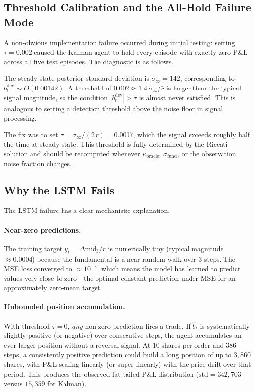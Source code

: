\documentclass[11pt]{article}
\begin{document}
\subsection{Threshold Calibration and the All-Hold Failure Mode}

A non-obvious implementation failure occurred during initial testing:
setting $\tau = 0.002$ caused the Kalman agent to hold every episode with
exactly zero P\&L across all five test episodes.
The diagnostic is as follows.

The steady-state posterior standard deviation is $\sigma_\infty = 142$\textcent,
corresponding to $b_t^{\text{dev}} \sim O(0.00142)$.
A threshold of $0.002 \approx 1.4\,\sigma_\infty/\bar{r}$ is larger than the
typical signal magnitude, so the condition $|b_t^{\text{dev}}| > \tau$ is
almost never satisfied.
This is analogous to setting a detection threshold above the noise floor in
signal processing.

The fix was to set $\tau = \sigma_\infty / (2\,\bar{r}) = 0.0007$,
which the signal exceeds roughly half the time at steady state.
This threshold is fully determined by the Riccati solution and should be
recomputed whenever $\kappa_{\text{oracle}}$, $\sigma_{\text{fund}}$, or
the observation noise fraction changes.

\subsection{Why the LSTM Fails}
\label{sec:lstm_failure}

The LSTM failure has a clear mechanistic explanation.

\paragraph{Near-zero predictions.}
The training target $y_t = \bar{\Delta\text{mid}}_{3} / \bar{r}$ is numerically
tiny (typical magnitude $\approx 0.0004$) because the fundamental is a
near-random walk over 3 steps.
The MSE loss converged to $\approx 10^{-8}$, which means the model has
learned to predict values very close to zero---the optimal constant prediction
under MSE for an approximately zero-mean target.

\paragraph{Unbounded position accumulation.}
With threshold $\tau = 0$, \emph{any} non-zero prediction fires a trade.
If $\hat{b}_t$ is systematically slightly positive (or negative) over
consecutive steps, the agent accumulates an ever-larger position without a
reversal signal.
At 10 shares per order and 386 steps, a consistently positive prediction
could build a long position of up to $3{,}860$ shares, with P\&L scaling
linearly (or super-linearly) with the price drift over that period.
This produces the observed fat-tailed P\&L distribution
($\text{std} = 342{,}703$\textcent{} versus $15{,}359$\textcent{} for Kalman).
\end{document}
